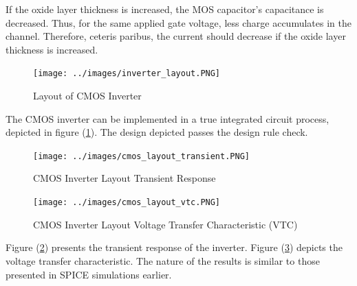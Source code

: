 If the oxide layer thickness is increased, the MOS capacitor's capacitance is decreased.
Thus, for the same applied gate voltage, less charge accumulates in the channel.
Therefore, ceteris paribus, the current should decrease if the oxide layer thickness is increased. \\

\FloatBarrier

\begin{figure}[h!]
	\centering
	\texttt{[image: ../images/inverter\_layout.PNG]}
	\caption{Layout of CMOS Inverter}
	\label{fig:inverter_layout}
\end{figure}

\FloatBarrier

The CMOS inverter can be implemented in a true integrated circuit process, depicted in figure (\ref{fig:inverter_layout}).
The design depicted passes the design rule check.

\FloatBarrier

\begin{figure}[h!]
	\centering
	\texttt{[image: ../images/cmos\_layout\_transient.PNG]}
	\caption{CMOS Inverter Layout Transient Response}
	\label{fig:cmos_layout_transient}
\end{figure}

\FloatBarrier

\FloatBarrier

\begin{figure}[h!]
	\centering
	\texttt{[image: ../images/cmos\_layout\_vtc.PNG]}
	\caption{CMOS Inverter Layout Voltage Transfer Characteristic (VTC)}
	\label{fig:cmos_layout_vtc}
\end{figure}

\FloatBarrier

Figure (\ref{fig:cmos_layout_transient}) presents the transient response of the inverter.
Figure (\ref{fig:cmos_layout_vtc}) depicts the voltage transfer characteristic.
The nature of the results is similar to those presented in SPICE simulations earlier.

